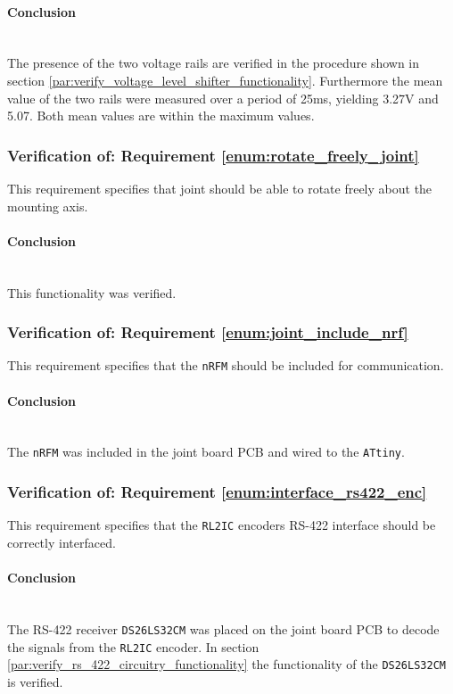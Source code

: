 \paragraph{Conclusion}~\\
The presence of the two voltage rails are verified in the procedure shown in section \ref{par:verify_voltage_level_shifter_functionality}.
Furthermore the mean value of the two rails were measured over a period of 25ms, yielding 3.27V and 5.07.
Both mean values are within the maximum values.

\subsubsection{Verification of: Requirement \ref{enum:rotate_freely_joint}} %
\label{ssub:verification_of_requirement_enum:rotate_freely_joint}
This requirement specifies that joint should be able to rotate freely about the mounting axis.

\paragraph{Conclusion}~\\
This functionality was verified.


\subsubsection{Verification of: Requirement \ref{enum:joint_include_nrf}} %
\label{ssub:verification_of_requirement_enum:joint_include_nrf}
This requirement specifies that the \texttt{nRFM} should be included for communication.

\paragraph{Conclusion}~\\
The \texttt{nRFM} was included in the joint board PCB and wired to the \texttt{ATtiny}.

\subsubsection{Verification of: Requirement \ref{enum:interface_rs422_enc}} %
\label{ssub:verification_of_requirement_enum:interface_rs422_enc}
This requirement specifies that the \texttt{RL2IC} encoders RS-422 interface should be correctly interfaced.

\paragraph{Conclusion}~\\
The RS-422 receiver \texttt{DS26LS32CM} was placed on the joint board PCB to decode the signals from the \texttt{RL2IC} encoder.
In section \ref{par:verify_rs_422_circuitry_functionality} the functionality of the \texttt{DS26LS32CM} is verified. 

